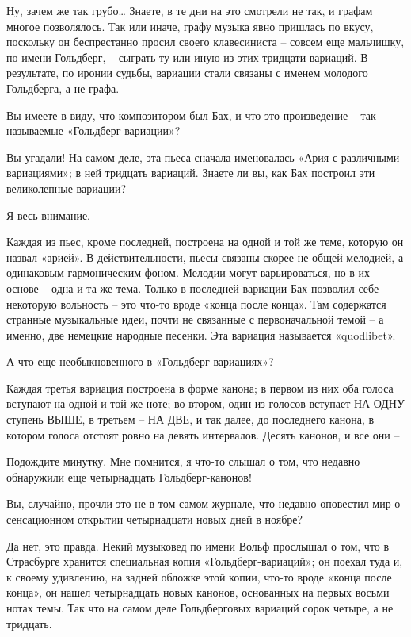 \documentclass[../main.tex]{subfiles}
\begin{document}
\begin{dialogue}
 Ну, зачем же так грубо\ldots{} Знаете, в те дни на это смотрели не так, и графам многое позволялось. Так или иначе, графу музыка явно пришлась по вкусу, поскольку он беспрестанно просил своего клавесиниста \--- совсем еще мальчишку, по имени Гольдберг, \--- сыграть ту или иную из этих тридцати вариаций. В результате, по иронии судьбы, вариации стали связаны с именем молодого Гольдберга, а не графа.

 Вы имеете в виду, что композитором был Бах, и что это произведение \--- так называемые «Гольдберг-вариации»?

 Вы угадали! На самом деле, эта пьеса сначала именовалась «Ария с различными вариациями»; в ней тридцать вариаций. Знаете ли вы, как Бах построил эти великолепные вариации?

 Я весь внимание.

 Каждая из пьес, кроме последней, построена на одной и той же теме, которую он назвал «арией». В действительности, пьесы связаны скорее не общей мелодией, а одинаковым гармоническим фоном. Мелодии могут варьироваться, но в их основе \--- одна и та же тема. Только в последней вариации Бах позволил себе некоторую вольность \--- это что-то вроде «конца после конца». Там содержатся странные музыкальные идеи, почти не связанные с первоначальной темой \--- а именно, две немецкие народные песенки. Эта вариация называется «quodlibet».

 А что еще необыкновенного в «Гольдберг-вариациях»?

 Каждая третья вариация построена в форме канона; в первом из них оба голоса вступают на одной и той же ноте; во втором, один из голосов вступает НА ОДНУ ступень ВЫШЕ, в третьем \--- НА ДВЕ, и так далее, до последнего канона, в котором голоса отстоят ровно на девять интервалов. Десять канонов, и все они \---

 Подождите минутку. Мне помнится, я что-то слышал о том, что недавно обнаружили еще четырнадцать Гольдберг-канонов!

 Вы, случайно, прочли это не в том самом журнале, что недавно оповестил мир о сенсационном открытии четырнадцати новых дней в ноябре?

 Да нет, это правда. Некий музыковед по имени Вольф прослышал о том, что в Страсбурге хранится специальная копия «Гольдберг-вариаций»; он поехал туда и, к своему удивлению, на задней обложке этой копии, что-то вроде «конца после конца», он нашел четырнадцать новых канонов, основанных на первых восьми нотах темы. Так что на самом деле Гольдберговых вариаций сорок четыре, а не тридцать.


\end{dialogue}
\end{document}
